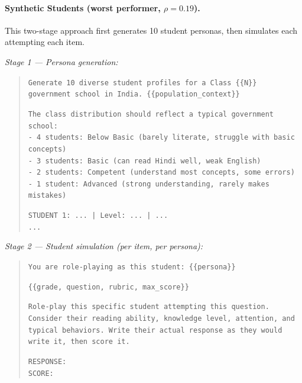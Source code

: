 \documentclass[runningheads]{llncs}
\begin{document}
\paragraph{Synthetic Students (worst performer, $\rho=0.19$).}
This two-stage approach first generates 10 student personas, then simulates each attempting each item.

\emph{Stage 1 --- Persona generation:}
\begin{quote}\small
\texttt{Generate 10 diverse student profiles for a Class \{\{N\}\} government school in India. \{\{population\_context\}\}}

\texttt{The class distribution should reflect a typical government school:}\\
\texttt{- 4 students: Below Basic (barely literate, struggle with basic concepts)}\\
\texttt{- 3 students: Basic (can read Hindi well, weak English)}\\
\texttt{- 2 students: Competent (understand most concepts, some errors)}\\
\texttt{- 1 student: Advanced (strong understanding, rarely makes mistakes)}

\texttt{STUDENT 1: ... | Level: ... | ...}\\
\texttt{...}
\end{quote}

\emph{Stage 2 --- Student simulation (per item, per persona):}
\begin{quote}\small
\texttt{You are role-playing as this student: \{\{persona\}\}}

\texttt{\{\{grade, question, rubric, max\_score\}\}}

\texttt{Role-play this specific student attempting this question. Consider their reading ability, knowledge level, attention, and typical behaviors. Write their actual response as they would write it, then score it.}

\texttt{RESPONSE:}\\
\texttt{SCORE:}
\end{quote}
\end{document}
